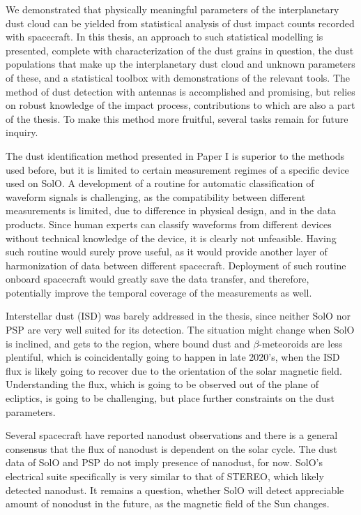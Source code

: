 We demonstrated that physically meaningful parameters of the interplanetary dust cloud can be yielded from statistical analysis of dust impact counts recorded with spacecraft. In this thesis, an approach to such statistical modelling is presented, complete with characterization of the dust grains in question, the dust populations that make up the interplanetary dust cloud and unknown parameters of these, and a statistical toolbox with demonstrations of the relevant tools. The method of dust detection with antennas is accomplished and promising, but relies on robust knowledge of the impact process, contributions to which are also a part of the thesis. To make this method more fruitful, several tasks remain for future inquiry.

The dust identification method presented in Paper I is superior to the methods used before, but it is limited to certain measurement regimes of a specific device used on SolO. A development of a routine for automatic classification of waveform signals is challenging, as the compatibility between different measurements is limited, due to difference in physical design, and in the data products. Since human experts can classify waveforms from different devices without technical knowledge of the device, it is clearly not unfeasible. Having such routine would surely prove useful, as it would provide another layer of harmonization of data between different spacecraft. Deployment of such routine onboard spacecraft would greatly save the data transfer, and therefore, potentially improve the temporal coverage of the measurements as well.

Interstellar dust (ISD) was barely addressed in the thesis, since neither SolO nor PSP are very well suited for its detection. The situation might change when SolO is inclined, and gets to the region, where bound dust and $\beta$-meteoroids are less plentiful, which is coincidentally going to happen in late 2020's, when the ISD flux is likely going to recover due to the orientation of the solar magnetic field. Understanding the flux, which is going to be observed out of the plane of ecliptics, is going to be challenging, but place further constraints on the dust parameters.

Several spacecraft have reported nanodust observations and there is a general consensus that the flux of nanodust is dependent on the solar cycle. The dust data of SolO and PSP do not imply presence of nanodust, for now. SolO's electrical suite specifically is very similar to that of STEREO, which likely detected nanodust. It remains a question, whether SolO will detect appreciable amount of nonodust in the future, as the magnetic field of the Sun changes.


